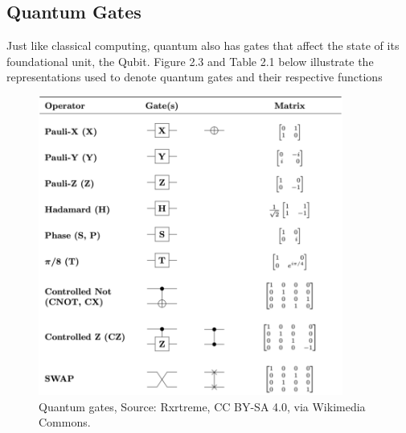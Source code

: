 \subsection{Quantum Gates}

Just like classical computing, quantum also has gates that affect the state of its foundational unit, the Qubit. Figure 2.3 and Table 2.1 below illustrate the representations used to denote quantum gates and their respective functions 


\begin{figure}[ht]
\centering
\includegraphics[width=10cm]{images/Quantum_Logic_Gates.png}
\caption{Quantum gates, Source: Rxrtreme, CC BY-SA 4.0, via Wikimedia Commons.}
\end{figure}


